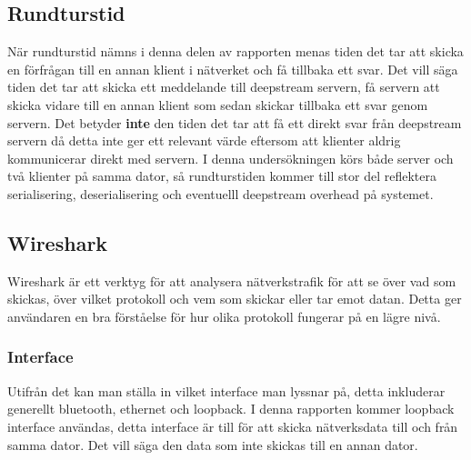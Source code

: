 \subsection{Rundturstid}
När rundturstid nämns i denna delen av rapporten menas tiden det tar att skicka en förfrågan till en annan klient i nätverket och få tillbaka ett svar. Det vill säga tiden det tar att skicka ett meddelande till deepstream servern, få servern att skicka vidare till en annan klient som sedan skickar tillbaka ett svar genom servern. Det betyder \textbf{inte} den tiden det tar att få ett direkt svar från deepstream servern då detta inte ger ett relevant värde eftersom att klienter aldrig kommunicerar direkt med servern. I denna undersökningen körs både server och två klienter på samma dator, så rundturstiden kommer till stor del reflektera serialisering, deserialisering och eventuelll deepstream overhead på systemet.

\subsection{Wireshark}
Wireshark\cite{wireshark:main} är ett verktyg för att analysera nätverkstrafik för att se över vad som skickas, över vilket protokoll och vem som skickar eller tar emot datan. Detta ger användaren en bra förståelse för hur olika protokoll fungerar på en lägre nivå.

\subsubsection{Interface}
Utifrån det kan man ställa in vilket interface\cite[p.~364]{networking} man lyssnar på, detta inkluderar generellt bluetooth, ethernet och loopback. I denna rapporten kommer loopback interface användas, detta interface är till för att skicka nätverksdata till och från samma dator. Det vill säga den data som inte skickas till en annan dator.
